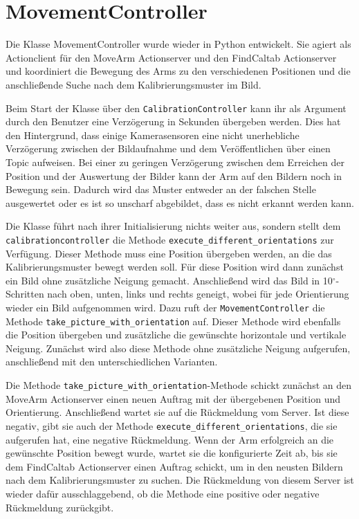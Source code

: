 \section{MovementController} %
\label{sec:movementcontroller_impl}
Die Klasse MovementController wurde wieder in Python entwickelt. Sie agiert als Actionclient für den MoveArm Actionserver und den FindCaltab Actionserver und koordiniert die Bewegung des Arms zu den verschiedenen Positionen und die anschließende Suche nach dem Kalibrierungsmuster im Bild.

Beim Start der Klasse über den \texttt{CalibrationController} kann ihr als Argument durch den Benutzer eine Verzögerung in Sekunden übergeben werden. Dies hat den Hintergrund, dass einige Kamerasensoren eine nicht unerhebliche Verzögerung zwischen der Bildaufnahme und dem Veröffentlichen über einen Topic aufweisen. Bei einer zu geringen Verzögerung zwischen dem Erreichen der Position und der Auswertung der Bilder kann der Arm auf den Bildern noch in Bewegung sein. Dadurch wird das Muster entweder an der falschen Stelle ausgewertet oder es ist so unscharf abgebildet, dass es nicht erkannt werden kann.

Die Klasse führt nach ihrer Initialisierung nichts weiter aus, sondern stellt dem \texttt{calibrationcontroller} die Methode \texttt{execute\_different\_orientations} zur Verfügung. Dieser Methode muss eine Position übergeben werden, an die das Kalibrierungsmuster bewegt werden soll. Für diese Position wird dann zunächst ein Bild ohne zusätzliche Neigung gemacht. Anschließend wird das Bild in 10$^\circ$-Schritten nach oben, unten, links und rechts geneigt, wobei für jede Orientierung wieder ein Bild aufgenommen wird. Dazu ruft der \texttt{MovementController} die Methode \texttt{take\_picture\_with\_orientation} auf. Dieser Methode wird ebenfalls die Position übergeben und zusätzliche die gewünschte horizontale und vertikale Neigung. Zunächst wird also diese Methode ohne zusätzliche Neigung aufgerufen, anschließend mit den unterschiedlichen Varianten.

Die Methode \texttt{take\_picture\_with\_orientation}-Methode schickt zunächst an den MoveArm Actionserver einen neuen Auftrag mit der übergebenen Position und Orientierung. Anschließend wartet sie auf die Rückmeldung vom Server. Ist diese negativ, gibt sie auch der Methode \texttt{execute\_different\_orientations}, die sie aufgerufen hat, eine negative Rückmeldung. Wenn der Arm erfolgreich an die gewünschte Position bewegt wurde, wartet sie die konfigurierte Zeit ab, bis sie dem FindCaltab Actionserver einen Auftrag schickt, um in den neusten Bildern nach dem Kalibrierungsmuster zu suchen. Die Rückmeldung von diesem Server ist wieder dafür ausschlaggebend, ob die Methode eine positive oder negative Rückmeldung zurückgibt.

